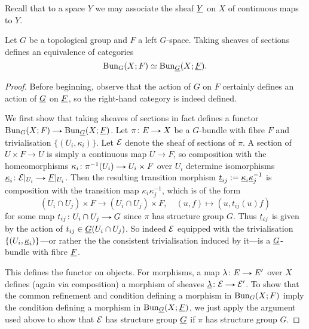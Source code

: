 Recall 
that to a space $Y$ we may associate the sheaf $\underline{Y}$ on $X$ of
continuous maps to $Y$.

\begin{proposition}
  Let $G$ be a topological group and $F$ a left $G$-space. Taking
  sheaves of sections defines an equivalence of categories
  \[
  \operatorname{Bun}_G(X;F) \simeq \operatorname{Bun}_{\underline{G}}(X;\underline{F}).
  \]
\end{proposition}

\begin{proof}
  Before beginning, observe that the action of $G$ on $F$ certainly
  defines an action of $\underline{G}$ on $\underline{F}$, so the right-hand category
  is indeed defined.

  We first show that taking sheaves of sections in fact defines a
  functor $\Bun_G(X;F) \to \Bun_{\u{G}}(X;\u{F})$. Let $\pi \c E \to
  X$ be a $G$-bundle with fibre $F$ and trivialisation
  $\{(U_i,\kappa_i)\}$. Let $\mathcal{E}$ denote the sheaf of sections of
  $\pi$. A section of $U \times F \to U$ is simply a continuous map $U
  \to F$, so composition with the homeomorphisms $\kappa_i \c
  \pi^{-1}(U_i) \to U_i \times F$ over $U_i$ determine isomorphisms
  $\u{\kappa}_i \c \E|_{U_i} \to \u{F}|_{U_i}$. Then the resulting
  transition morphism $\underline{t}_{ij} \mathrel{:=} \underline{\kappa}_i\underline{\kappa}_j^{-1}$
  is composition with the transition map $\kappa_i\kappa_j^{-1}$,
  which is of the form
  \[
  (U_i \cap U_j) \times F \to (U_i \cap U_j) \times F, \quad
  (u,f) \mapsto (u, t_{ij}(u)f)
  \]
  for some map $t_{ij} \c U_i \cap U_j \to G$ since $\pi$ has
  structure group $G$. Thus $\underline{t}_{ij}$ is given by the action of
  $t_{ij} \in \underline{G}(U_i \cap U_j)$. So indeed $\mathcal{E}$ equipped with the
  trivialisation $\{(U_i, \underline{\kappa}_i)\}$---or rather the the
  consistent trivialisation induced by it---is a $\underline{G}$-bundle with
  fibre $\underline{F}$.

  This defines the functor on objects. For morphisms, a map $\lambda
  \c E \to E'$ over $X$ defines (again via composition) a morphism of
  sheaves $\u{\lambda} \c \E \to \E'$. To show that the common
  refinement and condition defining a morphism in $\operatorname{Bun}_G(X;F)$ imply
  the condition defining a morphism in $\operatorname{Bun}_{\underline{G}}(X;\underline{F})$, we
  just apply the argument used above to show that $\mathcal{E}$ has structure
  group $\underline{G}$ if $\pi$ has structure group $G$.


\end{proof}
